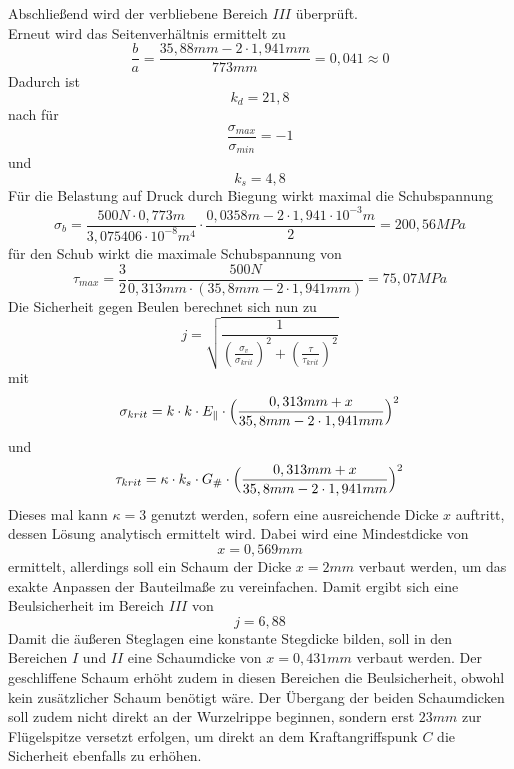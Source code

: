 \noindent Abschließend wird der verbliebene Bereich $III$ überprüft.\\
\noindent Erneut wird das Seitenverhältnis ermittelt zu 
\begin{equation}
	\frac{b}{a}=\frac{35,88mm - 2\cdot 1,941mm}{773mm}=0,041\approx 0
\end{equation}
Dadurch ist
\begin{equation}
	k_{d}=21,8
\end{equation}
nach \cite{item1} für 
\begin{equation}
	\frac{\sigma_{max}}{\sigma_{min}}=-1
\end{equation} 
und
\begin{equation}
	k_{s} = 4,8
\end{equation}
Für die Belastung auf Druck durch Biegung wirkt maximal die Schubspannung
\begin{equation}
	\sigma_{b} = \frac{500N\cdot 0,773m}{3,075406\cdot 10^{-8}m^{4}}\cdot\frac{0,0358m - 2\cdot 1,941\cdot 10^{-3}m}{2}=200,56 MPa
\end{equation}
für den Schub wirkt die maximale Schubspannung von
\begin{equation}
	\tau_{max}=\frac{3}{2}\frac{500N}{0,313mm\cdot(35,8mm-2\cdot 1,941mm)}=75,07MPa
\end{equation}
Die Sicherheit gegen Beulen berechnet sich nun zu 
\begin{equation}
	j=\sqrt{\frac{1}{(\frac{\sigma_{v}}{\sigma_{krit}})^{2}+(\frac{\tau}{\tau_{krit}})^{2}}}
\end{equation}
mit 
\begin{equation}
	\sigma_{krit}=k\cdot k\cdot E_{\parallel}\cdot \Bigl(\frac{0,313mm+x}{35,8mm -2\cdot 1,941mm}\Bigr)^{2}
\end{equation}
und
\begin{equation}
	\tau_{krit} = \kappa\cdot k_{s}\cdot G_{\#}\cdot\Bigl(\frac{0,313mm + x}{35,8mm -2\cdot 1,941mm}\Bigr)^{2}
\end{equation}
Dieses mal kann $\kappa=3$ genutzt werden, sofern eine ausreichende Dicke $x$ auftritt, dessen Lösung analytisch ermittelt wird. Dabei wird eine Mindestdicke von 
\begin{equation}
	x=0,569mm
\end{equation}
ermittelt, allerdings soll ein Schaum der Dicke $x=2mm$ verbaut werden, um das exakte Anpassen der Bauteilmaße zu vereinfachen. Damit ergibt sich eine Beulsicherheit im Bereich $III$ von
\begin{equation}
	j=6,88
\end{equation}
Damit die äußeren Steglagen eine konstante Stegdicke bilden, soll in den Bereichen $I$ und $II$ eine Schaumdicke von $x=0,431mm$ verbaut werden. Der geschliffene Schaum erhöht zudem in diesen Bereichen die Beulsicherheit, obwohl kein zusätzlicher Schaum benötigt wäre. Der Übergang der beiden Schaumdicken soll zudem nicht direkt an der Wurzelrippe beginnen, sondern erst $23mm$ zur Flügelspitze versetzt erfolgen, um direkt an dem Kraftangriffspunk $C$ die Sicherheit ebenfalls zu erhöhen.
